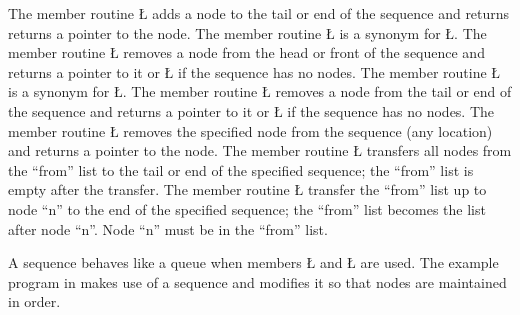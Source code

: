 \documentclass[openright,twoside]{report}
\begin{document}
The member routine \LGinlinetrue\LGbegin\lgrinde\L{}\endlgrinde\LGend{} adds a node to the tail or end of the sequence and returns returns a pointer to the node.
The member routine \LGinlinetrue\LGbegin\lgrinde\L{}\endlgrinde\LGend{} is a synonym for \LGinlinetrue\LGbegin\lgrinde\L{}\endlgrinde\LGend{}.
The member routine \LGinlinetrue\LGbegin\lgrinde\L{}\endlgrinde\LGend{} removes a node from the head or front of the sequence and returns a pointer to it or \LGinlinetrue\LGbegin\lgrinde\L{}\endlgrinde\LGend{} if the sequence has no nodes.
The member routine \LGinlinetrue\LGbegin\lgrinde\L{}\endlgrinde\LGend{} is a synonym for \LGinlinetrue\LGbegin\lgrinde\L{}\endlgrinde\LGend{}.
The member routine \LGinlinetrue\LGbegin\lgrinde\L{}\endlgrinde\LGend{} removes a node from the tail or end of the sequence and returns a pointer to it or \LGinlinetrue\LGbegin\lgrinde\L{}\endlgrinde\LGend{} if the sequence has no nodes.
The member routine \LGinlinetrue\LGbegin\lgrinde\L{}\endlgrinde\LGend{} removes the specified node from the sequence (any location) and returns a pointer to the node.
The member routine \LGinlinetrue\LGbegin\lgrinde\L{}\endlgrinde\LGend{} transfers all nodes from the ``from'' list to the tail or end of the specified sequence;
the ``from'' list is empty after the transfer.
The member routine \LGinlinetrue\LGbegin\lgrinde\L{}\endlgrinde\LGend{} transfer the ``from'' list up to node ``n'' to the end of the specified sequence;
the ``from'' list becomes the list after node ``n''.
Node ``n'' must be in the ``from'' list.

A sequence behaves like a queue when members \LGinlinetrue\LGbegin\lgrinde\L{}\endlgrinde\LGend{} and \LGinlinetrue\LGbegin\lgrinde\L{}\endlgrinde\LGend{} are used.
The example program in  makes use of a sequence and modifies it so that nodes are maintained in order.
\end{document}
